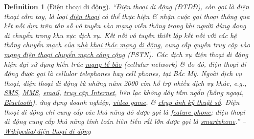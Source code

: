 \documentclass[12pt,twoside]{book}
\newtheorem{definition}{Definition}[section]
\begin{document}
\begin{definition}[Điện thoại di động]
	\label{def: điện thoại di động}
	``\emph{Điện thoại di động} (\emph{ĐTDĐ}), còn gọi là \emph{điện thoại cầm tay}, là loại \href{https://vi.wikipedia.org/wiki/%C4%90i%E1%BB%87n_tho%E1%BA%A1i}{điện thoại} có thể thực hiện \& nhận cuộc gọi thoại thông qua kết nối dựa trên \href{https://vi.wikipedia.org/wiki/T%E1%BA%A7n_s%E1%BB%91_v%C3%B4_tuy%E1%BA%BFn}{tần số vô tuyến} vào mạng \href{https://vi.wikipedia.org/wiki/Vi%E1%BB%85n_th%C3%B4ng}{viễn thông} trong khi người dùng đang di chuyển trong khu vực dịch vụ. Kết  nối vô tuyến thiết lập kết nối với các hệ thống chuyển mạch của \href{https://vi.wikipedia.org/wiki/Nh%C3%A0_m%E1%BA%A1ng}{nhà khai thác mạng di động}, cung cấp quyền truy cập vào \href{https://vi.wikipedia.org/wiki/M%E1%BA%A1ng_%C4%91i%E1%BB%87n_tho%E1%BA%A1i_chuy%E1%BB%83n_m%E1%BA%A1ch_c%C3%B4ng_c%E1%BB%99ng}{mạng điện thoại chuyển mạch công cộng} (PSTN). Các dịch vụ điện thoại di động hiện đại sử dụng kiến trúc \href{https://vi.wikipedia.org/wiki/M%E1%BA%A1ng_thi%E1%BA%BFt_b%E1%BB%8B_di_%C4%91%E1%BB%99ng}{mạng tế bào} (cellular network) \& do đó, điện thoại di động được gọi là \emph{cellular telephones} hay \emph{cell phones}, tại Bắc Mỹ. Ngoài dịch vụ thoại, điện thoại di động từ những năm 2000 còn hỗ trợ nhiều dịch vụ khác, e.g., \href{https://vi.wikipedia.org/wiki/SMS}{SMS}, \href{https://vi.wikipedia.org/wiki/D%E1%BB%8Bch_v%E1%BB%A5_nh%E1%BA%AFn_tin_%C4%91a_ph%C6%B0%C6%A1ng_ti%E1%BB%87n}{MMS}, \href{https://vi.wikipedia.org/wiki/Email}{email}, \href{https://vi.wikipedia.org/wiki/Truy_c%E1%BA%ADp_Internet}{truy cập Internet}, liên lạc không dây tầm ngắn (hồng ngoại, \href{https://vi.wikipedia.org/wiki/Bluetooth}{Bluetooth}), ứng dụng doanh nghiệp, \href{https://vi.wikipedia.org/wiki/Video_game}{video game}, \& \href{https://vi.wikipedia.org/wiki/Ch%E1%BB%A5p_%E1%BA%A3nh_k%E1%BB%B9_thu%E1%BA%ADt_s%E1%BB%91}{chụp ảnh kỹ thuật số}. Điện thoại di động chỉ cung cấp các khả năng đó được gọi là \href{https://vi.wikipedia.org/wiki/%C4%90i%E1%BB%87n_tho%E1%BA%A1i_ph%E1%BB%95_th%C3%B4ng}{feature phone}; điện thoại di động cung cấp khả năng tính toán tiên tiến rất lớn được gọi là \href{https://vi.wikipedia.org/wiki/Smartphone}{smartphone}.'' -- \href{https://vi.wikipedia.org/wiki/%C4%90i%E1%BB%87n_tho%E1%BA%A1i_di_%C4%91%E1%BB%99ng}{Wikipedia\emph{{\tt/}}điện thoại di động}
\end{definition}
\end{document}
